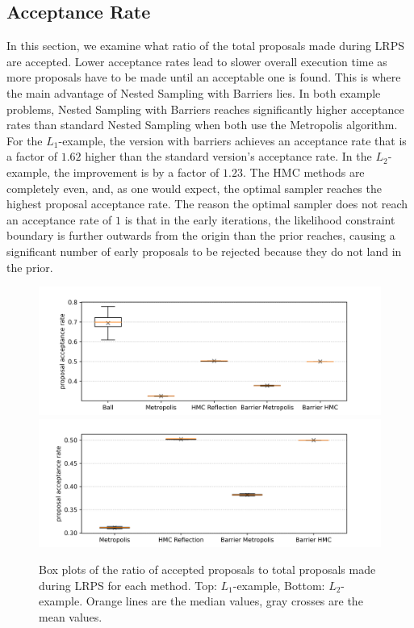 \documentclass[12pt, a4paper]{report}
\begin{document}
\subsection{Acceptance Rate}
In this section, we examine what ratio of the total proposals made during LRPS are accepted.
Lower acceptance rates lead to slower overall execution time as more proposals have to be made until an acceptable one is found.
This is where the main advantage of Nested Sampling with Barriers lies.
In both example problems, Nested Sampling with Barriers reaches significantly higher acceptance rates than standard Nested Sampling when both use the Metropolis algorithm.
For the $L_1$-example, the version with barriers achieves an acceptance rate that is a factor of $1.62$ higher than the standard version's acceptance rate.
In the $L_2$-example, the improvement is by a factor of $1.23$.
The HMC methods are completely even, and, as one would expect, the optimal sampler reaches the highest proposal acceptance rate.
The reason the optimal sampler does not reach an acceptance rate of $1$ is that in the early iterations, the likelihood constraint boundary is further outwards from the origin than the prior reaches, causing a significant number of early proposals to be rejected because they do not land in the prior.
\begin{figure}
    \centering
    \includegraphics[scale=0.4]{figs/results/acceptance_rates_spike_20d.png}
    \includegraphics[scale=0.4]{figs/results/acceptance_rates_spike_offcenter_20d.png}
    \caption{Box plots of the ratio of accepted proposals to total proposals made during LRPS for each method. Top: $L_1$-example, Bottom: $L_2$-example. Orange lines are the median values, gray crosses are the mean values.}
    \label{fig:results_acceptance_rates}
\end{figure}
\end{document}
